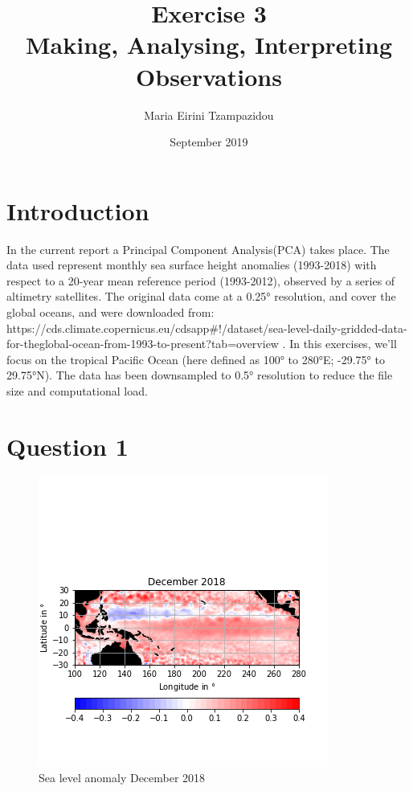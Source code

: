 \documentclass{article}
\title{Exercise 3 \\ Making, Analysing, Interpreting Observations}
\author{Maria Eirini Tzampazidou }
\date{September 2019}
\begin{document}
\maketitle

\section*{Introduction}

In the current report a Principal Component Analysis(PCA) takes place. The data used represent monthly sea surface height anomalies (1993-2018) with respect to a 20-year mean reference period (1993-2012), observed by a series of altimetry satellites. The original data come at a 0.25° resolution, and cover the global oceans, and were downloaded from: https://cds.climate.copernicus.eu/cdsapp#!/dataset/sea-level-daily-gridded-data-for-theglobal-ocean-from-1993-to-present?tab=overview .
In this exercises, we’ll focus on the tropical Pacific Ocean (here defined as 100° to 280°E; -29.75° to 29.75°N). The data has been downsampled to 0.5° resolution to reduce the file size and computational load.

\section*{Question 1}

\begin{figure}[b!]
\centering
\includegraphics[width=1.0\linewidth]{December2018(initial).png}
\caption{Sea level anomaly December 2018}
\label{fig:DEC}
\end{figure}
\end{document}
